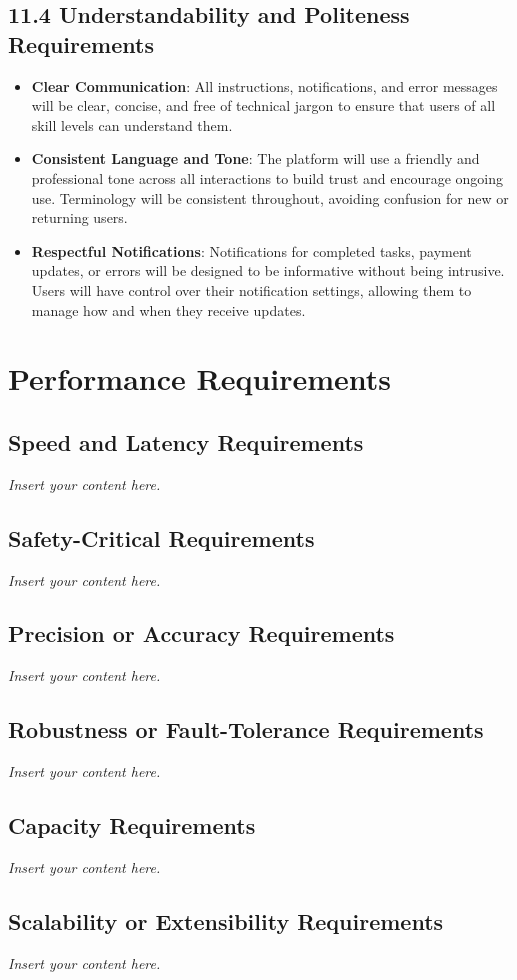 \documentclass[12pt]{article}
\newcommand{\lips}{\textit{Insert your content here.}}
\begin{document}
\subsection*{11.4 Understandability and Politeness Requirements}
\begin{itemize}[leftmargin=2cm]
    \item \textbf{Clear Communication}: All instructions, notifications, and error messages will be clear, concise, and free of technical jargon to ensure that users of all skill levels can understand them.
    \item \textbf{Consistent Language and Tone}: The platform will use a friendly and professional tone across all interactions to build trust and encourage ongoing use. Terminology will be consistent throughout, avoiding confusion for new or returning users.
    \item \textbf{Respectful Notifications}: Notifications for completed tasks, payment updates, or errors will be designed to be informative without being intrusive. Users will have control over their notification settings, allowing them to manage how and when they receive updates.
\end{itemize}


\section{Performance Requirements}
\subsection{Speed and Latency Requirements}
\lips
\subsection{Safety-Critical Requirements}
\lips
\subsection{Precision or Accuracy Requirements}
\lips
\subsection{Robustness or Fault-Tolerance Requirements}
\lips
\subsection{Capacity Requirements}
\lips
\subsection{Scalability or Extensibility Requirements}
\lips
\end{document}
